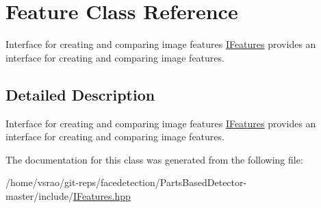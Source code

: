 \hypertarget{classFeature}{\section{Feature Class Reference}
\label{classFeature}
}


Interface for creating and comparing image features \hyperlink{classIFeatures}{I\-Features} provides an interface for creating and comparing image features.  




\subsection{Detailed Description}
Interface for creating and comparing image features \hyperlink{classIFeatures}{I\-Features} provides an interface for creating and comparing image features. 

The documentation for this class was generated from the following file\-:\begin{DoxyCompactItemize}
\item 
/home/vsrao/git-\/reps/facedetection/\-Parts\-Based\-Detector-\/master/include/\hyperlink{IFeatures_8hpp}{I\-Features.\-hpp}\end{DoxyCompactItemize}
